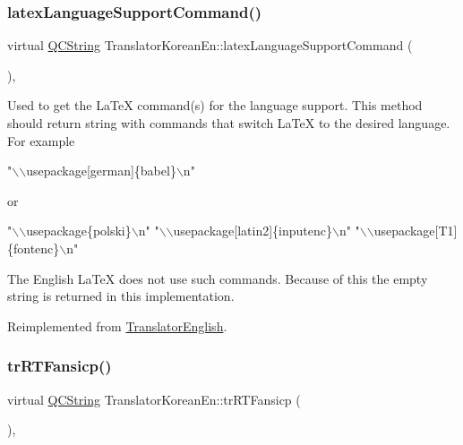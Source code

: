 \subsubsection{\texorpdfstring{latexLanguageSupportCommand()}{latexLanguageSupportCommand()}}
{\footnotesize\ttfamily virtual \mbox{\hyperlink{class_q_c_string}{Q\+C\+String}} Translator\+Korean\+En\+::latex\+Language\+Support\+Command (\begin{DoxyParamCaption}{ }\end{DoxyParamCaption})\hspace{0.3cm}{\ttfamily [inline]}, {\ttfamily [virtual]}}

Used to get the La\+TeX command(s) for the language support. This method should return string with commands that switch La\+TeX to the desired language. For example 
\begin{DoxyPre}"\(\backslash\)\(\backslash\)usepackage[german]\{babel\}\(\backslash\)n"
 \end{DoxyPre}
 or 
\begin{DoxyPre}"\(\backslash\)\(\backslash\)usepackage\{polski\}\(\backslash\)n"
 "\(\backslash\)\(\backslash\)usepackage[latin2]\{inputenc\}\(\backslash\)n"
 "\(\backslash\)\(\backslash\)usepackage[T1]\{fontenc\}\(\backslash\)n"
 \end{DoxyPre}


The English La\+TeX does not use such commands. Because of this the empty string is returned in this implementation. 

Reimplemented from \mbox{\hyperlink{class_translator_english_a48ecd4aaa9aa68947257ff29016a808a}{Translator\+English}}.

\mbox{\label{class_translator_korean_en_ac60d57743cc1cd0a7b6bc6c57a445b7e}} 
\subsubsection{\texorpdfstring{trRTFansicp()}{trRTFansicp()}}
{\footnotesize\ttfamily virtual \mbox{\hyperlink{class_q_c_string}{Q\+C\+String}} Translator\+Korean\+En\+::tr\+R\+T\+Fansicp (\begin{DoxyParamCaption}{ }\end{DoxyParamCaption})\hspace{0.3cm}{\ttfamily [inline]}, {\ttfamily [virtual]}}

